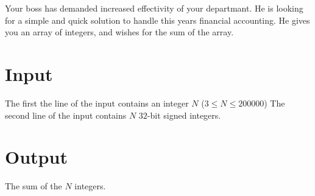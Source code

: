 

Your boss has demanded increased effectivity of your departmant.
He is looking for a simple and quick solution to handle this years financial accounting.
He gives you an array of integers, and wishes for the sum of the array.

\section*{Input}

The first the line of the input contains an integer $N$ ($3 \leq N \leq 200000$)
The second line of the input contains $N$ $32$-bit signed integers.

\section*{Output}

The sum of the $N$ integers.